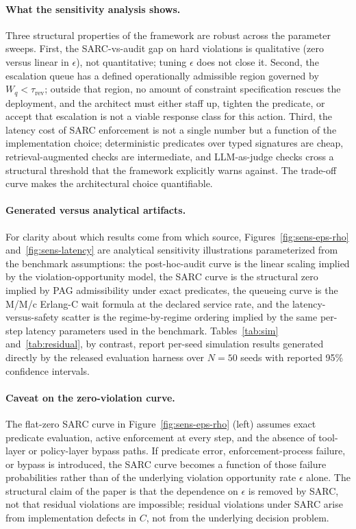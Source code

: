 \documentclass[11pt,a4paper]{article}
\theoremstyle{remark}
\begin{document}
\paragraph{What the sensitivity analysis shows.} Three structural properties of the framework are robust across the parameter sweeps. First, the SARC-vs-audit gap on hard violations is qualitative (zero versus linear in $\epsilon$), not quantitative; tuning $\epsilon$ does not close it. Second, the escalation queue has a defined operationally admissible region governed by $W_q < \tau_{\text{rev}}$; outside that region, no amount of constraint specification rescues the deployment, and the architect must either staff up, tighten the predicate, or accept that escalation is not a viable response class for this action. Third, the latency cost of SARC enforcement is not a single number but a function of the implementation choice; deterministic predicates over typed signatures are cheap, retrieval-augmented checks are intermediate, and LLM-as-judge checks cross a structural threshold that the framework explicitly warns against. The trade-off curve makes the architectural choice quantifiable.

\paragraph{Generated versus analytical artifacts.} For clarity about which results come from which source, Figures~\ref{fig:sens-eps-rho} and~\ref{fig:sens-latency} are analytical sensitivity illustrations parameterized from the benchmark assumptions: the post-hoc-audit curve is the linear scaling implied by the violation-opportunity model, the SARC curve is the structural zero implied by PAG admissibility under exact predicates, the queueing curve is the M/M/c Erlang-C wait formula at the declared service rate, and the latency-versus-safety scatter is the regime-by-regime ordering implied by the same per-step latency parameters used in the benchmark. Tables~\ref{tab:sim} and~\ref{tab:residual}, by contrast, report per-seed simulation results generated directly by the released evaluation harness over $N=50$ seeds with reported 95\% confidence intervals.

\paragraph{Caveat on the zero-violation curve.} The flat-zero SARC curve in Figure~\ref{fig:sens-eps-rho} (left) assumes exact predicate evaluation, active enforcement at every step, and the absence of tool-layer or policy-layer bypass paths. If predicate error, enforcement-process failure, or bypass is introduced, the SARC curve becomes a function of those failure probabilities rather than of the underlying violation opportunity rate $\epsilon$ alone. The structural claim of the paper is that the dependence on $\epsilon$ is removed by SARC, not that residual violations are impossible; residual violations under SARC arise from implementation defects in $C$, not from the underlying decision problem.
\end{document}
